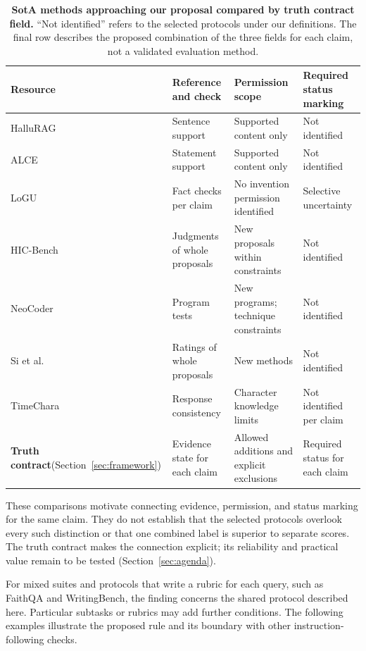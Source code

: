 \documentclass{clv2025}
\begin{document}
\begin{table}[!ht]
\centering\small
\caption{\textbf{SotA methods approaching our proposal compared by truth contract field.}
``Not identified'' refers to the selected protocols under our definitions.
The final row describes the proposed combination of the three fields for
each claim, not a validated evaluation method.}
\label{tab:precedents}
\begin{tabularx}{\linewidth}{@{}P{.17\linewidth}YYY@{}}
\toprule
\textbf{Resource} & \textbf{Reference and check} & \textbf{Permission scope} & \textbf{Required status marking}\\\midrule
HalluRAG & Sentence support & Supported content only & Not identified\\\addlinespace[4pt]
ALCE & Statement support & Supported content only & Not identified\\\addlinespace[4pt]
LoGU & Fact checks per claim & No invention permission identified & Selective uncertainty\\\addlinespace[4pt]
HIC-Bench & Judgments of whole proposals & New proposals within constraints & Not identified\\\addlinespace[4pt]
NeoCoder & Program tests & New programs; technique constraints & Not identified\\\addlinespace[4pt]
Si et al. & Ratings of whole proposals & New methods & Not identified\\\addlinespace[4pt]
TimeChara & Response consistency & Character knowledge limits & Not identified per claim\\\midrule
{}
\textbf{Truth contract}\newline(Section~\ref{sec:framework}) & Evidence state for each claim & Allowed additions and explicit exclusions & Required status for each claim\\
\bottomrule
\end{tabularx}


\end{table}

These comparisons motivate connecting evidence, permission, and status
marking for the same claim. They do not establish that the selected
protocols overlook every such distinction or that one combined label is
superior to separate scores. The truth contract makes the connection
explicit; its reliability and practical value remain to be tested
(Section~\ref{sec:agenda}).

For mixed suites and protocols that write a rubric for each query, such
as FaithQA and WritingBench, the finding concerns the shared protocol
described here. Particular subtasks or rubrics may add further conditions.
The following examples illustrate the proposed rule and its boundary
with other instruction-following checks.
\end{document}
